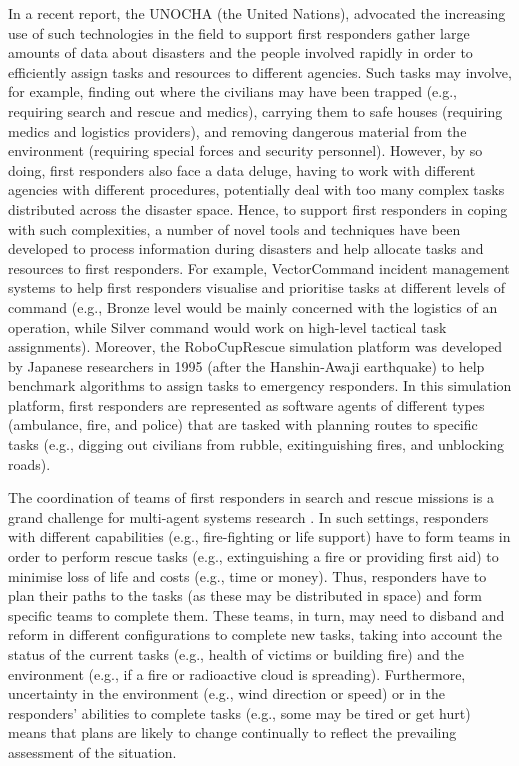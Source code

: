 In a recent report, the UNOCHA (the United Nations),  advocated the increasing use of such technologies in the field to support first responders gather large amounts of data about disasters and the people involved rapidly in order to efficiently assign tasks and resources to different agencies. Such tasks may involve, for example, finding out where the civilians may have been trapped (e.g., requiring search and rescue and medics), carrying them to safe houses (requiring medics and logistics providers), and removing dangerous material from the environment (requiring special forces and security personnel). However, by so doing, first responders  also face a data deluge, having to work with different agencies with different procedures,  potentially deal with too many complex tasks distributed across the disaster space. Hence, to support first responders in coping with such complexities, a number of novel tools and techniques have been developed to process information during disasters and help allocate tasks and resources to first responders. For example, VectorCommand \cite{vectorcommand} incident management systems to help first responders visualise and prioritise tasks at different levels of command (e.g., Bronze level would be mainly concerned with the logistics of an operation, while Silver command would work on high-level tactical task assignments). Moreover, the  RoboCupRescue simulation platform was developed by Japanese researchers in 1995 (after the Hanshin-Awaji earthquake) to help benchmark algorithms to assign tasks to emergency responders. In this simulation platform, first responders are represented as software agents of different types (ambulance, fire, and police) that are tasked with planning routes to specific tasks (e.g., digging out civilians from rubble, exitinguishing fires, and unblocking roads). 


The coordination of teams of first responders in search and rescue missions is a grand challenge for multi-agent systems research \cite{kitano:2001}. In such settings, responders with different capabilities (e.g., fire-fighting or life support) have to form teams in order to perform rescue tasks (e.g., extinguishing a fire or providing first aid) to minimise  loss of life and costs (e.g., time or money). Thus, responders have to plan their paths to the tasks (as these may be distributed in space) and form specific teams  to complete them. These teams, in turn, may  need to disband and reform in different configurations to complete new tasks, taking into account the status  of the current tasks  (e.g., health of victims or building fire) and the environment (e.g., if a fire or radioactive cloud is spreading). Furthermore, uncertainty in the environment (e.g., wind direction or speed) or in the responders' abilities to complete tasks (e.g., some may be tired or get hurt) means that plans are likely to change continually to reflect the prevailing assessment of the situation. 

